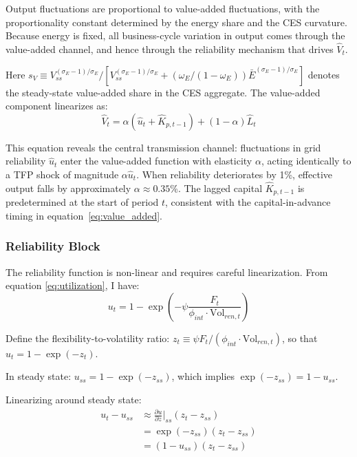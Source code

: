 \documentclass[12pt, a4paper]{article}
\begin{document}
	Output fluctuations are proportional to value-added fluctuations, with the proportionality constant determined by the energy share and the CES curvature. Because energy is fixed, all business-cycle variation in output comes through the value-added channel, and hence through the reliability mechanism that drives $\hat{V}_t$.
	
	Here $s_V \equiv V_{ss}^{(\sigma_E-1)/\sigma_E} / [V_{ss}^{(\sigma_E-1)/\sigma_E} + (\omega_E/(1-\omega_E)) \bar{E}^{(\sigma_E-1)/\sigma_E}]$ denotes the steady-state value-added share in the CES aggregate. The value-added component linearizes as:
	\begin{equation}
		\hat{V}_t = \alpha(\hat{u}_t + \hat{K}_{p,t-1}) + (1-\alpha)\hat{L}_t
		\label{eq:va_lin}
	\end{equation}
	
	This equation reveals the central transmission channel: fluctuations in grid reliability $\hat{u}_t$ enter the value-added function with elasticity $\alpha$, acting identically to a TFP shock of magnitude $\alpha \hat{u}_t$. When reliability deteriorates by 1\%, effective output falls by approximately $\alpha \approx 0.35$\%. The lagged capital $\hat{K}_{p,t-1}$ is predetermined at the start of period $t$, consistent with the capital-in-advance timing in equation~\eqref{eq:value_added}.
	
	\subsubsection{Reliability Block}
	
	The reliability function is non-linear and requires careful linearization. From equation \eqref{eq:utilization}, I have:
	\begin{equation}
		u_t = 1 - \exp\left(-\psi \frac{F_t}{\phi_{int} \cdot \text{Vol}_{ren,t}}\right)
	\end{equation}
	
	Define the flexibility-to-volatility ratio: $z_t \equiv \psi F_t / (\phi_{int} \cdot \text{Vol}_{ren,t})$, so that $u_t = 1 - \exp(-z_t)$.
	
	In steady state: $u_{ss} = 1 - \exp(-z_{ss})$, which implies $\exp(-z_{ss}) = 1 - u_{ss}$.
	
	Linearizing around steady state:
	\begin{align}
		u_t - u_{ss} &\approx \frac{\partial u}{\partial z}\bigg|_{ss} (z_t - z_{ss}) \\
		&= \exp(-z_{ss}) (z_t - z_{ss}) \\
		&= (1 - u_{ss})(z_t - z_{ss})
	\end{align}
	
\end{document}
